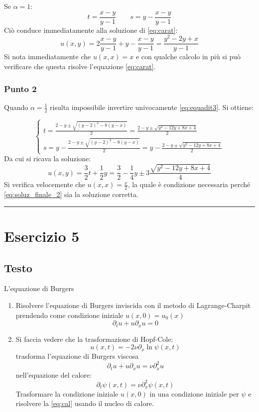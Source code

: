 \documentclass[]{scrartcl}
\newcommand{\qedsymbol}{\hfill \rule{0.7em}{0.7em}}
\newcommand{\px}{\partial_x}
\newcommand{\pt}{\partial_t}
\newcommand{\pdx}[1]{\partial^#1_x}
\newcommand{\xt}{(x,t)}
\begin{document}
\noindent Se $ \alpha = 1 $:
\[ t = \frac{x-y}{y-1} \qquad s = y - \frac{x-y}{y-1} \]
Ciò conduce immediatamente alla soluzione di \eqref{eq:carat}:
\[	u(x,y) = 2\frac{x-y}{y-1} + y - \frac{x-y}{y-1}	= \frac{y^2-2y+x}{y-1}\]
Si nota immediatamente che $ u(x,x) = x $ e con qualche calcolo in più si può verificare che questa risolve l'equazione \eqref{eq:carat}.
\subsubsection*{Punto 2}
Quando $ \alpha = \frac{1}{2} $ risulta impossibile invertire univocamente \eqref{eq:equadit3}. Si ottiene:

\[
\begin{cases}
t = \frac{2-y \pm \sqrt{(y-2)^2-8(y-x)}}{2} = \frac{2-y \pm \sqrt{y^2 -12y +8x +4}}{2} \\
s = y - \frac{2-y \pm \sqrt{(y-2)^2-8(y-x)}}{2} = y - \frac{2-y \pm \sqrt{y^2 -12y +8x +4}}{2}
\end{cases}
\]
Da cui si ricava la soluzione:
\begin{equation}	
u(x,y) = \frac{3}{2}t + \frac{1}{2}y = \frac{3}{2}- \frac{1}{4}y \pm 3\frac{\sqrt{y^2 -12y +8x +4}}{4} 
\label{eq:soluz_finale_2}
\end{equation}
Si verifica velocemente che $ u(x,x) = \frac{x}{2} $, la quale è condizione necessaria perché \eqref{eq:soluz_finale_2} sia la soluzione corretta.
\qedsymbol
\section*{Esercizio 5}

\subsection*{Testo} L'equazione di Burgers

\begin{enumerate}
	\item Risolvere l'equazione di Burgers inviscida con il metodo di Lagrange-Charpit prendendo come condizione iniziale $ u(x,0) = u_0(x) $
	\begin{equation}
	\pt u + u \px u = 0
	\label{eq:burgers2}
	\end{equation}
	\item Si faccia vedere che la trasformazione di Hopf-Cole:
	\begin{equation}
	u\xt = -2 \nu \px \ln \psi\xt
	\label{eq:hopf}
	\end{equation}	
	trasforma l'equazione di Burgers viscosa	
	\begin{equation}
 	\pt u + u \px u = \nu \pdx{2}u 
	\label{eq:burgers3}
	\end{equation}	 
	nell'equazione del calore:
	\begin{equation}
	\pt \psi\xt = \nu \pdx{2} \psi \xt
	\label{eq:cal}
	\end{equation}
	Trasformare la condizione iniziale $ u(x,0) $ in una condizione iniziale per $ \psi $ e risolvere la \eqref{eq:cal} usando il nucleo di calore.	
\end{enumerate}
\end{document}
